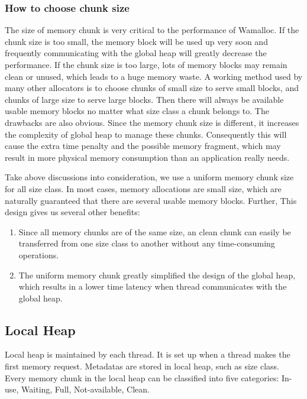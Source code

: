 \documentclass[10pt, conference, compsocconf]{IEEEtran}
\begin{document}
\subsubsection{How to choose chunk size}
The size of memory chunk is very critical to the performance of Wamalloc. 
If the chunk size is too small, 
the memory block will be used up very soon and frequently communicating with the global heap will greatly decrease the performance.
If the chunk size is too large, lots of memory blocks may remain clean or unused, which leads to a huge memory waste. 
A working method used by many other allocators is to choose chunks of small size to serve small blocks, 
and chunks of large size to serve large blocks.
Then there will always be available usable memory blocks no matter what size class a chunk belongs to.
The drawbacks are also obvious.
Since the memory chunk size is different, it increases the complexity of global heap to manage these chunks.
Consequently this will cause the extra time penalty and the possible memory fragment, 
which may result in more physical memory consumption than an application really needs.

Take above discussions into consideration, 
we use a uniform memory chunk size for all size class. 
In most cases, memory allocations are small size, 
which are naturally guaranteed that there are several usable memory blocks. 
Further, This design gives us several other benefits: 
\begin{enumerate}
    \item Since all memory chunks are of the same size, an clean chunk can easily be transferred from one size class to another without any time-consuming operations.
    \item The uniform memory chunk greatly simplified the design of the global heap, 
        which results in a lower time latency when thread communicates with the global heap.
\end{enumerate}

\subsection{Local Heap}

Local heap is maintained by each thread. 
It is set up when a thread makes the first memory request.
Metadatas are stored in local heap, such as size class.
Every memory chunk in the local heap can be classified into five categories: In-use, Waiting, Full, Not-available, Clean.
\end{document}
